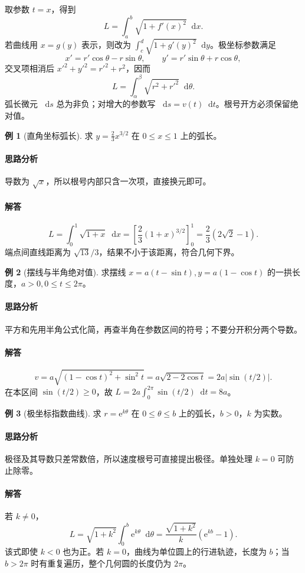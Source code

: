\documentclass[UTF8,fontset=fandol,12pt,oneside,openany]{ctexrep}
\newcommand{\dd}{\mathop{}\!\mathrm d}
\newcommand{\ee}{\mathrm e}
\theoremstyle{definition}
\newtheorem{example}{例}[chapter]
\begin{document}
取参数 $t=x$，得到
\[
 L=\int_a^b\sqrt{1+f'(x)^2}\dd x.
\]
若曲线用 $x=g(y)$ 表示，则改为 $\int_c^d\sqrt{1+g'(y)^2}\dd y$。极坐标参数满足
\[
 x'=r'\cos\theta-r\sin\theta,\qquad
 y'=r'\sin\theta+r\cos\theta,
\]
交叉项相消后 $x'^2+y'^2=r'^2+r^2$，因而
\[
 L=\int_\alpha^\beta\sqrt{r^2+r'^2}\dd\theta.
\]
弧长微元 $\dd s$ 总为非负；对增大的参数写 $\dd s=v(t)\dd t$。根号开方必须保留绝对值。

\begin{example}[直角坐标弧长]
求 $y=\frac23x^{3/2}$ 在 $0\le x\le1$ 上的弧长。
\end{example}
\paragraph{思路分析}导数为 $\sqrt x$，所以根号内部只含一次项，直接换元即可。
\paragraph{解答}
\[
 L=\int_0^1\sqrt{1+x}\dd x
 =\left[\frac23(1+x)^{3/2}\right]_0^1
 =\frac23(2\sqrt2-1).
\]
端点间直线距离为 $\sqrt{13}/3$，结果不小于该距离，符合几何下界。

\begin{example}[摆线与半角绝对值]
求摆线 $x=a(t-\sin t),y=a(1-\cos t)$ 的一拱长度，$a>0,0\le t\le2\pi$。
\end{example}
\paragraph{思路分析}平方和先用半角公式化简，再查半角在参数区间的符号；不要分开积分两个导数。
\paragraph{解答}
\[
 v=a\sqrt{(1-\cos t)^2+\sin^2t}
 =a\sqrt{2-2\cos t}=2a|\sin(t/2)|.
\]
在本区间 $\sin(t/2)\ge0$，故
$L=2a\int_0^{2\pi}\sin(t/2)\dd t=8a$。

\begin{example}[极坐标指数曲线]
求 $r=\ee^{k\theta}$ 在 $0\le\theta\le b$ 上的弧长，$b>0$，$k$ 为实数。
\end{example}
\paragraph{思路分析}极径及其导数只差常数倍，所以速度根号可直接提出极径。单独处理 $k=0$ 可防止除零。
\paragraph{解答}若 $k\ne0$，
\[
 L=\sqrt{1+k^2}\int_0^b\ee^{k\theta}\dd\theta
 =\frac{\sqrt{1+k^2}}{k}(\ee^{kb}-1).
\]
该式即使 $k<0$ 也为正。若 $k=0$，曲线为单位圆上的行进轨迹，长度为 $b$；当 $b>2\pi$ 时有重复遍历，整个几何圆的长度仍为 $2\pi$。
\end{document}
